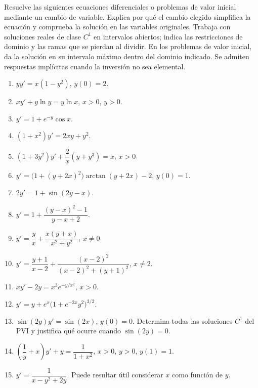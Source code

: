 Resuelve las siguientes ecuaciones diferenciales o problemas de valor inicial mediante un cambio de variable. Explica por qué el cambio elegido simplifica la ecuación y comprueba la solución en las variables originales. Trabaja con soluciones reales de clase $C^1$ en intervalos abiertos; indica las restricciones de dominio y las ramas que se pierdan al dividir. En los problemas de valor inicial, da la solución en su intervalo máximo dentro del dominio indicado. Se admiten respuestas implícitas cuando la inversión no sea elemental.
\begin{enumerate}[label=\alph*)]
\item $yy'=x(1-y^2)$, \quad $y(0)=2$.
\item $xy'+y\ln y=y\ln x$, \quad $x>0$, $y>0$.
\item $y'=1+e^{-y}\cos x$.
\item $(1+x^2)y'=2xy+y^2$.
\item $(1+3y^2)y'+\dfrac{2}{x}(y+y^3)=x$, \quad $x>0$.
\item $y'=\bigl(1+(y+2x)^2\bigr)\arctan(y+2x)-2$, \quad $y(0)=1$.
\item $2y'=1+\sin(2y-x)$.
\item $y'=1+\dfrac{(y-x)^2-1}{y-x+2}$.
\item $y'=\dfrac yx+\dfrac{x(y+x)}{x^2+y^2}$, \quad $x\ne0$.
\item $y'=\dfrac{y+1}{x-2}+\dfrac{(x-2)^2}{(x-2)^2+(y+1)^2}$, \quad $x\ne2$.
\item $xy'-2y=x^3e^{-y/x^2}$, \quad $x>0$.
\item $y'=y+e^x\bigl(1+e^{-2x}y^2\bigr)^{3/2}$.
\item $\sin(2y)y'=\sin(2x)$, \quad $y(0)=0$. Determina todas las soluciones $C^1$ del PVI y justifica qué ocurre cuando $\sin(2y)=0$.
\item $\left(\dfrac1y+x\right)y'+y=\dfrac{1}{1+x^2}$, \quad $x>0$, $y>0$, \quad $y(1)=1$.
\item $y'=\dfrac{1}{x-y^2+2y}$. Puede resultar útil considerar $x$ como función de $y$.
\end{enumerate}
